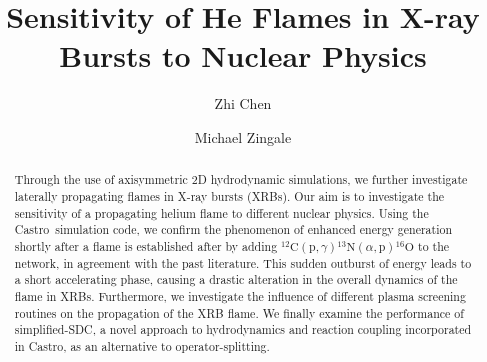 \documentclass[preprint,times,tighten]{aastex631}
\newcommand{\castro}{{\sf Castro}}
\begin{document}
\title{Sensitivity of He Flames in X-ray Bursts to Nuclear Physics}


\author[0000-0002-2839-107X]{Zhi Chen}

\author[0000-0001-8401-030X]{Michael Zingale}





\begin{abstract}
Through the use of axisymmetric 2D hydrodynamic simulations, we further investigate laterally propagating flames in X-ray bursts (XRBs). Our aim is to investigate the sensitivity of a propagating helium flame to different nuclear physics.  Using the \castro\ simulation code, we confirm the phenomenon of enhanced energy generation shortly after a flame is established after by adding ${}^{12}\mbox{C}(\mbox{p}, \gamma) {}^{13}\mbox{N}(\alpha, \mbox{p}){}^{16}\mbox{O}$ to the network, in agreement with the past literature. This sudden outburst of energy leads to a short accelerating phase, causing a drastic alteration in the overall dynamics of the flame in XRBs. %
Furthermore, we investigate the influence of different plasma screening routines on the propagation of the XRB flame. We finally examine the performance of simplified-SDC, a novel approach to hydrodynamics and reaction coupling incorporated in \castro, as an alternative to operator-splitting.


\end{abstract}
\end{document}
